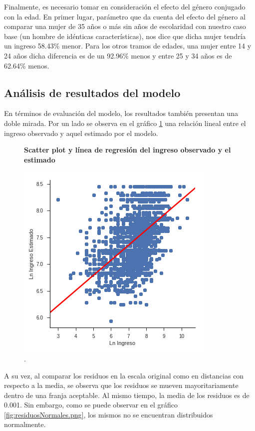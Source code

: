Finalmente, es necesario tomar en consideración el efecto del género conjugado con la edad. En primer lugar, parámetro que da cuenta del efecto del género al comparar una mujer de 35 años o más sin años de escolaridad con nuestro caso base (un hombre de idénticas características), nos dice que dicha mujer tendría un ingreso 58.43\% menor. Para los otros tramos de edades, una mujer entre 14 y 24 años dicha diferencia es de un 92.96\% menos y entre 25 y 34 años es de 62.64\% menos. 

\subsection{Análisis de resultados del modelo}

En términos de evaluación del modelo, los resultados también presentan una doble mirada. Por un lado se observa en el gráfico \ref{fig:predictedIncomeVincome.png} una relación lineal entre el ingreso observado y aquel estimado por el modelo. 

    \begin{figure}[!htb]
    	\centering
    	\textbf{Scatter plot y línea de regresión del ingreso observado y el estimado}\par\medskip
    	\includegraphics[scale = 0.4]{../img/capitulo3/predictedIncomeVincome.png}
    	\caption{.}
    	\label{fig:predictedIncomeVincome.png}
    \end{figure}

A su vez, al comparar los residuos en la escala original como en distancias con respecto a la media, se observa que los residuos se mueven mayoritariamente dentro de una franja aceptable. Al mismo tiempo, la media de los residuos es de 0.001. Sin embargo, como se puede observar en el gráfico \ref{fig:residuosNormales.png}, los mismos no se encuentran distribuidos normalmente.

